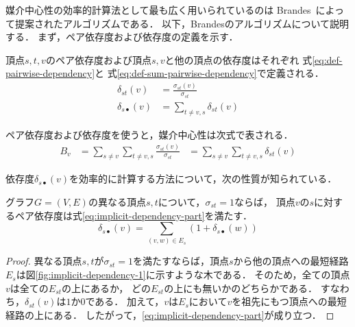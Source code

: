 媒介中心性の効率的計算法として最も広く用いられているのは
Brandes~\cite{Brandes2001}によって提案されたアルゴリズムである．
以下，Brandesのアルゴリズムについて説明する．
まず，ペア依存度および依存度の定義を示す．

\begin{definition}
  \label{def:pairwise-dependency}
  頂点$s,t,v$のペア依存度および頂点$s,v$と他の頂点の依存度はそれぞれ
  式\eqref{eq:def-pairwise-dependency}と
  式\eqref{eq:def-sum-pairwise-dependency}で定義される．
    \begin{align}
      \delta_{st}(v)&=\frac{\sigma_{st}(v)}{\sigma_{st}}
      \label{eq:def-pairwise-dependency} \\
      \delta_{s\bullet}(v)&=\sum_{t\neq v,s}\delta_{st}(v)
      \label{eq:def-sum-pairwise-dependency}
    \end{align}
\end{definition}

ペア依存度および依存度を使うと，媒介中心性は次式で表される．
\begin{equation*}
  \begin{aligned}
    B_v&=\sum_{s\neq v}\sum_{t\neq v,s}\frac{\sigma_{st}(v)}{\sigma_{st}}
    &=\sum_{s\neq v}\sum_{t\neq v,s}\delta_{st}(v)
  \end{aligned}
\end{equation*}

依存度$\delta_{s\bullet}(v)$を効率的に計算する方法について，次の性質が知られている．

\begin{lemma}
  \label{lemma:implicit-dependency-part}
  グラフ$G=(V,E)$の異なる頂点$s,t$について，$\sigma_{st}=1$ならば，
  頂点$v$の$s$に対するペア依存度は式\eqref{eq:implicit-dependency-part}を満たす．
  \begin{equation}
    \label{eq:implicit-dependency-part}
    \delta_{s\bullet}(v)=\sum_{(v,w)\in E_s}(1+\delta_{s\bullet}(w))
  \end{equation}
\end{lemma}
\begin{proof}
  異なる頂点$s,t$が$\sigma_{st}=1$を満たすならば，頂点$s$から他の頂点への最短経路
  $E_{s}$は図\ref{fig:implicit-dependency-1}に示すような木である．
  そのため，全ての頂点$v$は全ての$E_{st}$の上にあるか，
  どの$E_{st}$の上にも無いかのどちらかである．
  すなわち，$\delta_{st}(v)$は$1$か$0$である．
  加えて，$v$は$E_s$において$v$を祖先にもつ頂点への最短経路の上にある．
  したがって，\eqref{eq:implicit-dependency-part}が成り立つ．
\end{proof}

